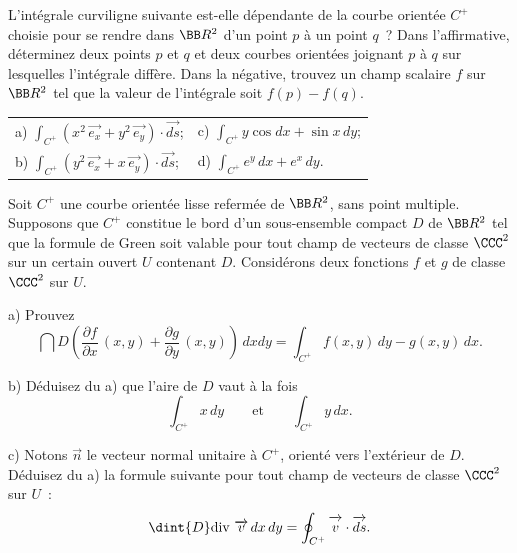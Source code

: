 \documentclass[12pt,french,oneside,a4paper]{memoir} %
\begin{document}
\begin{exo}
L'intégrale curviligne suivante est-elle dépendante de la
courbe orientée $C^+$ choisie pour se rendre dans $\BB R^2$ d'un
point $p$ à un point $q$~? Dans l'affirmative, déterminez deux
points $p$ et $q$ et deux courbes orientées joignant $p$ à $q$
sur lesquelles l'intégrale diffère. Dans la négative, trouvez
un champ scalaire $f$ sur $\BB R^2$ tel que la valeur de
l'intégrale soit $f(p)-f(q)$.

\begin{tabular}{ll}
a) $\displaystyle{\int_{C^+}(x^2\,\overrightarrow{e_x}
+y^2\,\overrightarrow{e_y})
\cdot\overrightarrow{ds}}$;\qquad\qquad\qquad&
c) $\displaystyle{\int_{C^+}y\cos dx+\sin x\,dy}$;\\[2mm]
b) $\displaystyle{\int_{C^+}(y^2\,\overrightarrow{e_x}
+x\,\overrightarrow{e_y})
\cdot\overrightarrow{ds}}$;&
d) $\displaystyle{\int_{C^+}e^y\,dx+e^x\,dy}$.
\end{tabular}
\end{exo}
\begin{exo}
Soit $C^+$ une courbe orientée lisse refermée de $\BB
R^2$, sans point multiple. Supposons que $C^+$ constitue le bord
d'un sous-ensemble compact $D$ de $\BB R^2$ tel que la formule de
Green soit valable pour tout champ de vecteurs de classe $\CCC^2$ sur
un certain ouvert $U$ contenant $D$. Considérons deux fonctions
$f$ et $g$ de classe $\CCC^2$ sur $U$.

a) Prouvez
$$
\displaystyle{
\dint{D}\left(\frac{\partial f}{\partial x}\,(x,y)+
\frac{\partial g}{\partial
y}\,(x,y)\right)\,dxdy=\int_{C^+}f(x,y)\,dy-g(x,y)\,dx
}.
$$

b) Déduisez du a) que l'aire de $D$ vaut à la fois
$$
\displaystyle{\int_{C^+}x\,dy}\qquad\mbox{et}\qquad
\displaystyle{\int_{C^+}y\,dx}.
$$

c) Notons $\overrightarrow n$ le vecteur normal unitaire à $C^+$,
orienté vers l'extérieur de $D$. Déduisez du a) la formule
suivante pour tout champ de vecteurs de classe $\CCC^2$ sur $U$~:
$$
\displaystyle{
\dint{D}\mbox{div }\overrightarrow
v\,dx\,dy=\oint_{C^+}\overrightarrow{\mathstrut
v}\cdot\overrightarrow{\mathstrut{ds}}}. $$
\end{exo}
\end{document}
